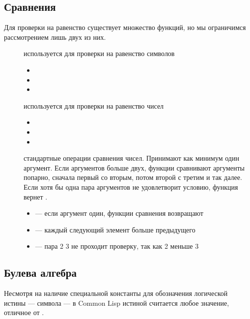 \documentclass[a4paper, 12pt, titlepage, twoside]{article}
\newenvironment{examples}
               {\begin{itemize}\renewcommand{\labelitemi}{ }}
               {\end{itemize}}
\begin{document}
\subsection{Сравнения}
Для проверки на равенство существует множество функций, но мы ограничимся рассмотрением лишь двух из них.
\begin{description}
\item [] используется для проверки на равенство символов
  \begin{examples}
  \item {}
  \item {}
  \item {}
  \end{examples}
\item [\lisp{=}] используется для проверки на равенство чисел
  \begin{examples}
  \item {}
  \item {}
  \item {}
  \end{examples}
\item [\lisp{> < >= <=}] стандартные операции сравнения чисел. Принимают как минимум один аргумент. Если аргументов больше двух, функции сравнивают аргументы попарно, сначала первый со вторым, потом второй с третим и так далее. Если хотя бы одна пара аргументов не удовлетворит условию, функция вернет .
  \begin{examples}
  \item {} --- если аргумент один, функции сравнения возвращают 
  \item {} --- каждый следующий элемент больше предыдущего
  \item {} --- пара 2 3 не проходит проверку, так как 2 меньше 3
  \end{examples}
\end{description}
\subsection{Булева алгебра} %
Несмотря на наличие специальной константы для обозначения логической истины --- символа  --- в Common Lisp истиной считается любое значение, отличное от .
\end{document}
